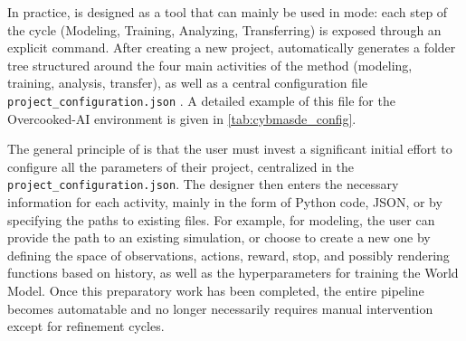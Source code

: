In practice,  is designed as a tool that can mainly be used in  mode: each step of the  cycle (Modeling, Training, Analyzing, Transferring) is exposed through an explicit command.
%
After creating a new project,  automatically generates a folder tree structured around the four main activities of the  method (modeling, training, analysis, transfer), as well as a central configuration file \texttt{project\_configuration.json} . A detailed example of this file for the Overcooked-AI environment is given in \autoref{tab:cybmasde_config}.



The general principle of  is that the user must invest a significant initial effort to configure all the parameters of their project, centralized in the \texttt {project_configuration.json}.
The designer then enters the necessary information for each activity, mainly in the form of Python code, JSON, or by specifying the paths to existing files. For example, for modeling, the user can provide the path to an existing simulation, or choose to create a new one by defining the space of observations, actions, reward, stop, and possibly rendering functions based on history, as well as the hyperparameters for training the World Model.
Once this preparatory work has been completed, the entire pipeline becomes automatable and no longer necessarily requires manual intervention except for refinement cycles.

\medskip

